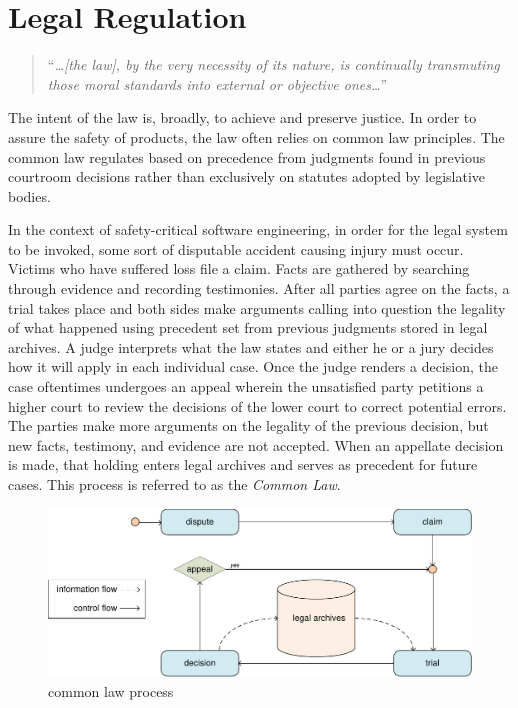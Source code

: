 \documentclass[12pt]{report}
\begin{document}
\section{Legal Regulation} 

\begin{quote}
``\textit{\ldots [the law], by the very necessity of its nature, is continually transmuting those moral standards into external or objective ones\ldots}''
\end{quote}

The intent of the law is, broadly, to achieve and preserve justice. In order to assure the safety of products, the law often relies on common law principles. The common law regulates based on precedence from judgments found in previous courtroom decisions rather than exclusively on statutes adopted by legislative bodies. 

In the context of safety-critical software engineering, in order for the legal system to be invoked, some sort of disputable accident causing injury must occur. Victims who have suffered loss file a claim. Facts are gathered by searching through evidence and recording testimonies. After all parties agree on the facts, a trial takes place and both sides make arguments calling into question the legality of what happened using precedent set from previous judgments stored in legal archives. A judge interprets what the law states and either he or a jury decides how it will apply in each individual case. Once the judge renders a decision, the case oftentimes undergoes an appeal wherein the unsatisfied party petitions a higher court to review the decisions of the lower court to correct potential errors. The parties make more arguments on the legality of the previous decision, but new facts, testimony, and evidence are not accepted. When an appellate decision is made, that holding enters legal archives and serves as precedent for future cases. This process is referred to as the \textit{Common Law}. 

\begin{figure}[t] 
\begin{center} 
\includegraphics[scale=0.73]{figures/commonlaw.pdf} 
\end{center} 
\caption{common law process} 
\label{fig:commonlaw} 
\end{figure} 
\end{document}
